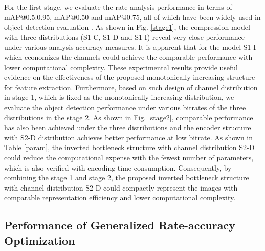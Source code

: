 \documentclass[transmag]{IEEEtran}
\begin{document}
For the first stage, we evaluate the rate-analysis performance in terms of mAP@0.5:0.95, mAP@0.50 and mAP@0.75, all of which have been widely used in object detection evaluation \cite{ren2015faster, wang2018pelee}. As shown in Fig. \ref{stage1}, the compression model with three distributions (S1-C, S1-D and S1-I) reveal very close performance under various analysis accuracy measures. It is apparent that for the model S1-I which economizes the channels could achieve the comparable performance with lower computational complexity. 
These experimental results provide useful evidence on the effectiveness of the proposed monotonically increasing structure for feature extraction.
Furthermore, based on such design of channel distribution in stage 1, which is fixed as the monotonically increasing distribution, we evaluate the object detection performance under various bitrates of the three distributions in the stage 2. As shown in Fig. \ref{stage2}, comparable performance has also been achieved under the three distributions and the encoder structure with S2-D distribution achieves better performance at low bitrate. As shown in Table \ref{param}, the inverted bottleneck structure with channel distribution S2-D could reduce the computational expense with the fewest number of parameters, {which is also verified with encoding time consumption}. Consequently, by combining the stage 1 and stage 2, the proposed inverted bottleneck structure {with channel distribution S2-D} could compactly represent the images with comparable representation efficiency and lower computational complexity. 


\subsection{Performance of Generalized Rate-accuracy Optimization}
\end{document}
